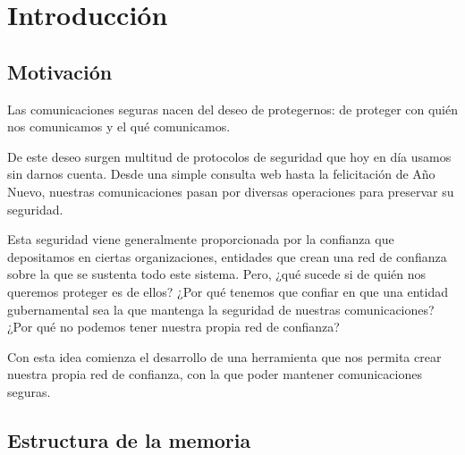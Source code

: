 
\chapter{Introducción} %

\label{Chapter1}


\newcommand{\keyword}[1]{\textbf{#1}}
\newcommand{\tabhead}[1]{\textbf{#1}}
\newcommand{\code}[1]{\texttt{#1}}
\newcommand{\file}[1]{\texttt{\bfseries#1}}
\newcommand{\option}[1]{\texttt{\itshape#1}}
\newcommand{\Mod}[1]{\ (\mathrm{mod}\ #1)}


\section{Motivación}

Las comunicaciones seguras nacen del deseo de protegernos: de proteger con quién nos comunicamos y el qué comunicamos.

De este deseo surgen multitud de protocolos de seguridad que hoy en día usamos sin darnos cuenta. Desde una simple consulta web hasta la felicitación de Año Nuevo, nuestras comunicaciones pasan por diversas operaciones para preservar su seguridad.

Esta seguridad viene generalmente proporcionada por la confianza que depositamos en ciertas organizaciones, entidades que crean una red de confianza sobre la que se sustenta todo este sistema. Pero, ¿qué sucede si de quién nos queremos proteger es de ellos? ¿Por qué tenemos que confiar en que una entidad gubernamental sea la que mantenga la seguridad de nuestras comunicaciones? ¿Por qué no podemos tener nuestra propia red de confianza?

Con esta idea comienza el desarrollo de una herramienta que nos permita crear nuestra propia red de confianza, con la que poder mantener comunicaciones seguras.


\section{Estructura de la memoria}

